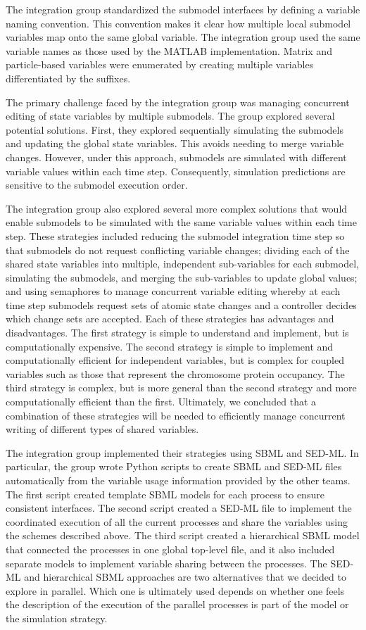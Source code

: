 \documentclass[journal,transmag]{IEEEtran}
\begin{document}
The integration group standardized the submodel interfaces by defining a variable naming convention. This convention makes it clear how multiple local submodel variables map onto the same global variable. The integration group used the same variable names as those used by the MATLAB implementation. Matrix and particle-based variables were enumerated by creating multiple variables differentiated by the suffixes.

The primary challenge faced by the integration group was managing concurrent editing of state variables by multiple submodels. The group explored several potential solutions. First, they explored sequentially simulating the submodels and updating the global state variables. This avoids needing to merge variable changes. However, under this approach, submodels are simulated with different variable values within each time step. Consequently, simulation predictions are sensitive to the submodel execution order. 

The integration group also explored several more complex solutions that would enable submodels to be simulated with the same variable values within each time step. These strategies included reducing the submodel integration time step so that submodels do not request conflicting variable changes; dividing each of the shared state variables into multiple, independent sub-variables for each submodel, simulating the submodels, and merging the sub-variables to update global values; and using semaphores to manage concurrent variable editing whereby at each time step submodels request sets of atomic state changes and a controller decides which change sets are accepted. Each of these strategies has advantages and disadvantages. The first strategy is simple to understand and implement, but is computationally expensive. The second strategy is simple to implement and computationally efficient for independent variables, but is complex for coupled variables such as those that represent the chromosome protein occupancy. The third strategy is complex, but is more general than the second strategy and more computationally efficient than the first. Ultimately, we concluded that a combination of these strategies will be needed to efficiently manage concurrent writing of different types of shared variables. 

The integration group implemented their strategies using SBML and SED-ML.  In particular, the group wrote Python scripts to create SBML and SED-ML files automatically from the variable usage information provided by the other teams.  The first script created template SBML models for each process to ensure consistent interfaces.  The second script created a SED-ML file to implement the coordinated execution of all the current processes and share the variables using the schemes described above.  The third script created a hierarchical SBML model that connected the processes in one global top-level file, and it also included separate models to implement variable sharing between the processes.  The SED-ML and hierarchical SBML approaches are two alternatives that we decided to explore in parallel.  Which one is ultimately used depends on whether one feels the description of the execution of the parallel processes is part of the model or the simulation strategy.
\end{document}
